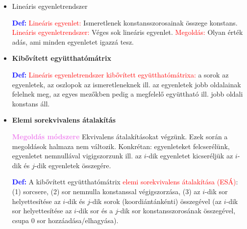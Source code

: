 \documentclass[../../szobeli.tex]{subfiles}
\begin{document}
\begin{center}
    \noindent{}
\end{center}

    \begin{itemize}
        \item Lineáris egyenletrendszer
        
            \textcolor{blue}{\textbf{Def:}} \textcolor{red}{Lineáris egyenlet:} Ismeretlenek konstansszorosainak összege konstans. \textcolor{red}{Lineáris egyenletrendszer:} Véges sok lineáris egyenlet. \textcolor{red}{Megoldás:} Olyan érték adás, ami minden egyenletet igazzá tesz.

        \item \textbf{Kibővített együtthatómátrix} 
        
            \textcolor{blue}{\textbf{Def:}} \textcolor{red}{Lineáris egyenletrendszer kibővített együtthatómátrixa:} a sorok az egyenletek, az oszlopok az ismeretleneknek ill. az egyenletek jobb oldalainak felelnek meg, az egyes mezőkben pedig a megfelelő együttható ill. jobb oldali konstans áll. 
            
        \item \textbf{Elemi sorekvivalens átalakítás} 
        
            \textcolor{violet}{\textbf{Megoldás módszere}} Ekvivalens átalakításokat végzünk. Ezek során a megoldások halmaza nem változik. Konkrétan: egyenleteket felcserélünk, egyenletet nemnullával vigigszorzunk ill. az $i$-dik egyenletet kicseréljük az $i$-dik és $j$-dik egyenletek összegére.
            
            \textcolor{blue}{\textbf{Def:}} A kibővített együtthatómátrix \textcolor{red}{elemi sorekvivalens átalakítása (ESÁ)}: (1) sorcsere, (2) sor nemnulla konstanssal végigszorzása, (3) az $i$-dik sor helyettesítése az $i$-dik és $j$-dik sorok (koordiántánkénti) összegével (az $i$-dik sor helyettesítése az $i$-dik sor és a $j$-dik sor konstansszorosának összegével, csupa 0 sor hozzáadása/elhagyása).


\end{itemize}
\end{document}
